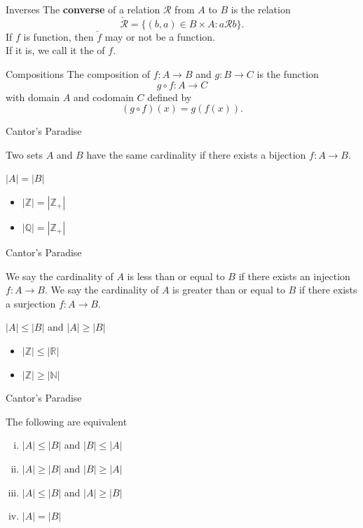 \documentclass{beamer}
\begin{document}
\begin{frame}{Inverses}
The \textbf{converse} of a relation $\mathcal R$ from $A$ to $B$ is the relation
\pause
$$\check{\mathcal R} = \{(b,a)\in B\times A: a\mathcal R b\}.$$
\pause
If $f$ is  function, then $\check f$ may or not be a function.\\
\pause
If it is, we call it the  of $f$.
\end{frame}

\begin{frame}{Compositions}
The composition of $f: A\rightarrow B$ and $g: B\rightarrow C$ is the function
\pause
$$g\circ f: A\rightarrow C$$
\pause
with domain $A$ and codomain $C$ defined by
\pause
$$(g\circ f)(x)  = g(f(x)).$$
\end{frame}

\begin{frame}{Cantor's Paradise}
\begin{defn}
Two sets $A$ and $B$ have the same cardinality if there exists a bijection $f: A\rightarrow B$.
\end{defn}
  $|A| = |B|$
\begin{itemize}
\item $|\mathbb Z| = |\mathbb Z_+|$
\item $|\mathbb Q| = |\mathbb Z_+|$
\end{itemize}
\end{frame}

\begin{frame}{Cantor's Paradise}
\begin{defn}
We say the cardinality of $A$ is less than or equal to $B$ if there exists an injection $f: A\rightarrow B$.
We say the cardinality of $A$ is greater than or equal to $B$ if there exists a surjection $f: A\rightarrow B$.
\end{defn}
  $|A| \leq |B|$ and $|A|\geq |B|$
\begin{itemize}
\item $|\mathbb Z| \leq |\mathbb R|$
\item $|\mathbb Z| \geq |\mathbb N|$
\end{itemize}
\end{frame}


\begin{frame}{Cantor's Paradise}
\begin{thm}
The following are equivalent
\begin{enumerate}[(i)]
\item $|A|\leq |B|$  and $|B|\leq |A|$
\item $|A|\geq |B|$  and $|B|\geq |A|$
\item $|A|\leq |B|$  and $|A|\geq |B|$
\item $|A|= |B|$
\end{enumerate}
\end{thm}
\end{frame}
\end{document}

